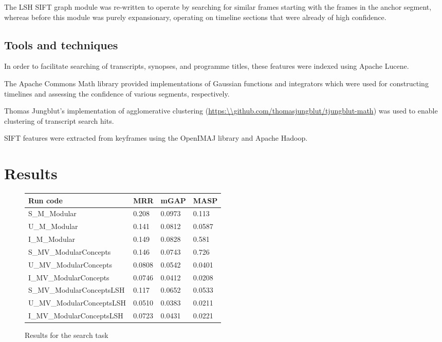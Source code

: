 \documentclass{../acm_proc_article-me11_tweaked}
\begin{document}
The LSH SIFT graph module was re-written to operate by searching for similar 
frames starting with the frames in the anchor segment, whereas before this 
module was purely expansionary, operating on timeline sections that were 
already of high confidence.

\subsection{Tools and techniques}
In order to facilitate searching of transcripts, synopses, and programme 
titles, these features were indexed using Apache Lucene.

The Apache Commons Math library provided implementations of Gaussian functions 
and integrators which were used for constructing timelines and assessing the 
confidence of various segments, respectively.

Thomas Jungblut's implementation of agglomerative clustering 
(\url{https:\\github.com/thomasjungblut/tjungblut-math}) was used to 
enable clustering of transcript search hits.

SIFT features were extracted from keyframes using the OpenIMAJ 
library\cite{Hare:2011:OIJ:2072298.2072421} and Apache Hadoop.

\section{Results}

\begin{figure}
\begin{tabu} to 1.1\linewidth {|l|X|X|X|}
\hline
\textbf{Run code} & \textbf{MRR\footnotemark[1]} &
\textbf{mGAP\footnotemark[2]} &
\textbf{MASP\footnotemark[3]} \\
\hline
S\_M\_Modular & 0.208 & 0.0973 & 0.113 \\
U\_M\_Modular & 0.141 & 0.0812 & 0.0587 \\
I\_M\_Modular & 0.149 & 0.0828 & 0.581 \\
S\_MV\_ModularConcepts & 0.146 & 0.0743 & 0.726 \\
U\_MV\_ModularConcepts & 0.0808 & 0.0542 & 0.0401 \\
I\_MV\_ModularConcepts & 0.0746 & 0.0412 & 0.0208 \\
S\_MV\_ModularConceptsLSH & 0.117 & 0.0652 & 0.0533 \\
U\_MV\_ModularConceptsLSH & 0.0510 & 0.0383 & 0.0211 \\
I\_MV\_ModularConceptsLSH & 0.0723 & 0.0431 & 0.0221 \\
\hline
\end{tabu}
\caption{Results for the search task}
\label{tbl:searchresults}
\end{figure}
\end{document}
